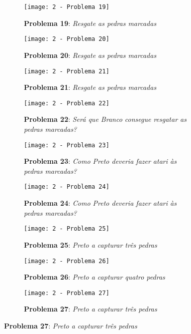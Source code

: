 \begin{figure}[p!]
    \centering
    \captionsetup{justification=raggedright,singlelinecheck=false}
    \begin{subfigure}[t]{.3\textwidth}
        \texttt{[image: 2 - Problema 19]}
        \caption*{\textbf{Problema 19}: \emph{Resgate as pedras marcadas}}
    \end{subfigure}
    \hfill
    \begin{subfigure}[t]{.3\textwidth}
        \texttt{[image: 2 - Problema 20]}
        \caption*{\textbf{Problema 20}: \emph{Resgate as pedras marcadas}}
    \end{subfigure}
    \hfill
    \begin{subfigure}[t]{.3\textwidth}
        \texttt{[image: 2 - Problema 21]}
        \caption*{\textbf{Problema 21}: \emph{Resgate as pedras marcadas}}
    \end{subfigure}
    \par\bigskip
    \begin{subfigure}[t]{.3\textwidth}
        \texttt{[image: 2 - Problema 22]}
        \caption*{\textbf{Problema 22}: \emph{Será que Branco consegue resgatar as pedras marcadas?}}
    \end{subfigure}
    \hfill
    \begin{subfigure}[t]{.3\textwidth}
        \texttt{[image: 2 - Problema 23]}
        \caption*{\textbf{Problema 23}: \emph{Como Preto deveria fazer atari às pedras marcadas?}}
    \end{subfigure}
    \hfill
    \begin{subfigure}[t]{.3\textwidth}
        \texttt{[image: 2 - Problema 24]}
        \caption*{\textbf{Problema 24}: \emph{Como Preto deveria fazer atari às pedras marcadas?}}
    \end{subfigure}
    \par\bigskip
    \begin{subfigure}[t]{.3\textwidth}
        \texttt{[image: 2 - Problema 25]}
        \caption*{\textbf{Problema 25}: \emph{Preto a capturar três pedras}}
    \end{subfigure}
    \hfill
    \begin{subfigure}[t]{.3\textwidth}
        \texttt{[image: 2 - Problema 26]}
        \caption*{\textbf{Problema 26}: \emph{Preto a capturar quatro pedras}}
    \end{subfigure}
    \hfill
    \begin{subfigure}[t]{.3\textwidth}
        \texttt{[image: 2 - Problema 27]}
        \caption*{\textbf{Problema 27}: \emph{Preto a capturar três pedras}}
    \end{subfigure}
\end{figure}

